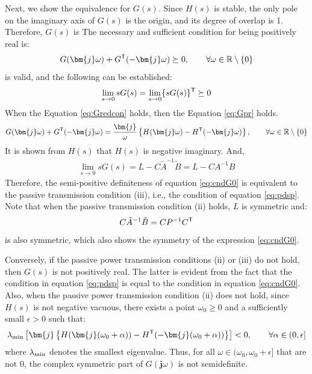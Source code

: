 \documentclass[tombow,dvipdfmx]{corona-a5-1.1}
\begin{document}
\begin{証明}
Next, we show the equivalence for $G(s)$.
Since $H(s)$ is stable, the only pole on the imaginary axis of $G(s)$ is the origin, and its degree of overlap is 1.
Therefore, $G(s)$ is
The necessary and sufficient condition for being positively real is:
\begin{align}\label{eq:Gpr}
G(\bm{j}\omega) + G^{\sf T}(-\bm{j}\omega) \succeq 0
,\qquad \forall \omega \in \mathbb{R}\setminus\{0\}
\end{align}
is valid, and the following can be established:
\begin{align}\label{eq:cndG0}
\lim_{s\rightarrow 0} s G(s) = \lim_{s\rightarrow 0} \{ s G(s)\}^{\sf T}\succeq 0
\end{align}
When the Equation \ref{eq:Gredcon} holds, then the Equation \ref{eq:Gpr} holds.
\begin{align}\label{eq:NIineq}
G(\bm{j}\omega) + G^{\sf T}(-\bm{j}\omega)
=
\frac{\bm{j}}{\omega} \left\{
H(\bm{j}\omega) - H^{\sf T}(-\bm{j}\omega)
\right\}
,\qquad \forall \omega \in \mathbb{R}\setminus\{0\}
\end{align}
It is shown from $H(s)$ that $H(s)$ is negative imaginary.
And,
\begin{align*}
\lim_{s\rightarrow 0} s G(s) =
L - C\tilde{A}^{-1}\tilde{B} = L - C A^{-1} B
\end{align*}
Therefore, the semi-positive definiteness of equation \ref{eq:cndG0} is equivalent to the passive transmission condition (iii), i.e., the condition of equation \ref{eq:pdsp}.
Note that when the passive transmission condition (ii) holds, $L$ is symmetric and:
\begin{align*}
C\tilde{A}^{-1}\tilde{B} = C P^{-1} C^{\sf T}
\end{align*}
is also symmetric, which also shows the symmetry of the expression \ref{eq:cndG0}.

Conversely, if the passive power transmission conditions (ii) or (iii) do not hold, then $G(s)$ is not positively real.
The latter is evident from the fact that the condition in equation \ref{eq:pdsp} is equal to the condition in equation \ref{eq:cndG0}.
Also, when the passive power transmission condition (ii) does not hold, since $H(s)$ is not negative vacuous, 
there exists a point $\omega_0\geq 0$ and a sufficiently small $\epsilon >0$ such that:
\begin{align*}
\lambda_{\rm min}\left[
\bm{j}
\left\{
H(\bm{j}(\omega_0 + \alpha )) - H^{\sf T}(-\bm{j}(\omega_0 + \alpha ))
\right\}
\right] < 0
,\qquad
\forall \alpha \in (0,\epsilon] 
\end{align*}
where $\lambda_{\rm min}$ denotes the smallest eigenvalue.
Thus, for all $\omega \in (\omega_0, \omega_0+\epsilon] $ that are not 0, the complex symmetric part of $G(\bm{j} \omega) $ is not semidefinite.
\end{証明}
\end{document}
